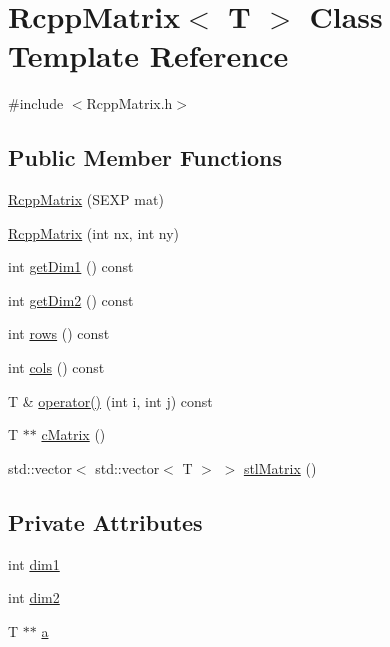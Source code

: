 \hypertarget{classRcppMatrix}{
\section{RcppMatrix$<$ T $>$ Class Template Reference}
\label{classRcppMatrix}
}


{\ttfamily \#include $<$RcppMatrix.h$>$}\subsection*{Public Member Functions}
\begin{DoxyCompactItemize}
\item 
\hyperlink{classRcppMatrix_a6cdd09180c21b504d1455ae2bc8939a7}{RcppMatrix} (SEXP mat)
\item 
\hyperlink{classRcppMatrix_a9ac16e2fcccd2a21a33097139e4ec253}{RcppMatrix} (int nx, int ny)
\item 
int \hyperlink{classRcppMatrix_af0ff9517b871e3c7aad237c57ef87498}{getDim1} () const 
\item 
int \hyperlink{classRcppMatrix_a10bd09feab53fdb931f5f654db21ebc9}{getDim2} () const 
\item 
int \hyperlink{classRcppMatrix_aa32cfb9a1d44e5aee0c332a12fbe37c1}{rows} () const 
\item 
int \hyperlink{classRcppMatrix_a36dac30029a2e0414d42151cf6f60581}{cols} () const 
\item 
T \& \hyperlink{classRcppMatrix_a20f4baf657160d8708f941bb99faa33a}{operator()} (int i, int j) const 
\item 
T $\ast$$\ast$ \hyperlink{classRcppMatrix_ae94a95b2125bd594965e26a93c994da4}{cMatrix} ()
\item 
std::vector$<$ std::vector$<$ T $>$ $>$ \hyperlink{classRcppMatrix_ae74547edb5d989adb87b2e483153de89}{stlMatrix} ()
\end{DoxyCompactItemize}
\subsection*{Private Attributes}
\begin{DoxyCompactItemize}
\item 
int \hyperlink{classRcppMatrix_a3b2f3ef7c2b482e4f7e7f4f96b787128}{dim1}
\item 
int \hyperlink{classRcppMatrix_ad01bc64d89dcc475f7c90f1580bf5d52}{dim2}
\item 
T $\ast$$\ast$ \hyperlink{classRcppMatrix_a3f4dad8e2aed525c9b20e98d262ec31e}{a}
\end{DoxyCompactItemize}


